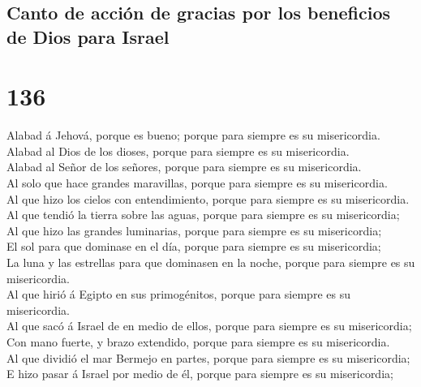 \hypertarget{canto-de-acciuxf3n-de-gracias-por-los-beneficios-de-dios-para-israel}{%
\subsection{Canto de acción de gracias por los beneficios de Dios para
Israel}\label{canto-de-acciuxf3n-de-gracias-por-los-beneficios-de-dios-para-israel}}

\hypertarget{section-19-136}{%
\section{136}\label{section-19-136}}

 Alabad á Jehová, porque es bueno; porque para siempre es
su misericordia.\\
 Alabad al Dios de los dioses, porque para siempre es su
misericordia.\\
 Alabad al Señor de los señores, porque para siempre es su
misericordia.\\
 Al solo que hace grandes maravillas, porque para siempre
es su misericordia.\\
 Al que hizo los cielos con entendimiento, porque para
siempre es su misericordia.\\
 Al que tendió la tierra sobre las aguas, porque para
siempre es su misericordia;\\
 Al que hizo las grandes luminarias, porque para siempre
es su misericordia;\\
 El sol para que dominase en el día, porque para siempre
es su misericordia;\\
 La luna y las estrellas para que dominasen en la noche,
porque para siempre es su misericordia.\\
 Al que hirió á Egipto en sus primogénitos, porque para
siempre es su misericordia.\\
 Al que sacó á Israel de en medio de ellos, porque para
siempre es su misericordia;\\
 Con mano fuerte, y brazo extendido, porque para siempre
es su misericordia.\\
 Al que dividió el mar Bermejo en partes, porque para
siempre es su misericordia;\\
 E hizo pasar á Israel por medio de él, porque para
siempre es su misericordia;\\
